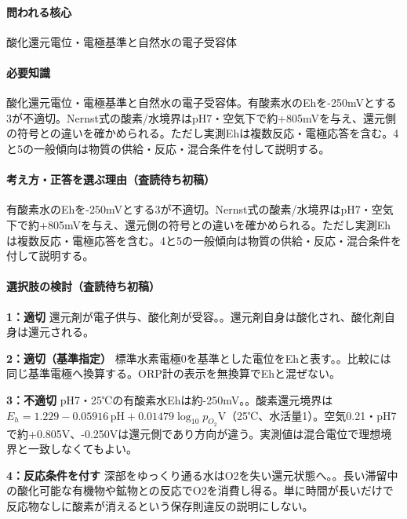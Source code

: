 \paragraph{問われる核心} 酸化還元電位・電極基準と自然水の電子受容体

\paragraph{必要知識} 酸化還元電位・電極基準と自然水の電子受容体。有酸素水のEhを-250mVとする3が不適切。Nernst式の酸素/水境界はpH7・空気下で約+805mVを与え、還元側の符号との違いを確かめられる。ただし実測Ehは複数反応・電極応答を含む。4と5の一般傾向は物質の供給・反応・混合条件を付して説明する。

\paragraph{考え方・正答を選ぶ理由（査読待ち初稿）} 有酸素水のEhを-250mVとする3が不適切。Nernst式の酸素/水境界はpH7・空気下で約+805mVを与え、還元側の符号との違いを確かめられる。ただし実測Ehは複数反応・電極応答を含む。4と5の一般傾向は物質の供給・反応・混合条件を付して説明する。

\paragraph{選択肢の検討（査読待ち初稿）}\mbox{}\par

\noindent\textbf{1：適切} 還元剤が電子供与、酸化剤が受容。。還元剤自身は酸化され、酸化剤自身は還元される。\par

\noindent\textbf{2：適切（基準指定）} 標準水素電極0を基準とした電位をEhと表す。。比較には同じ基準電極へ換算する。ORP計の表示を無換算でEhと混ぜない。\par

\noindent\textbf{3：不適切} pH7・25℃の有酸素水Ehは約-250mV。。酸素還元境界は\(E_h=1.229-0.05916\,\mathrm{pH}+0.01479\log_{10}p_{O_2}\)V（25℃、水活量1）。空気0.21・pH7で約+0.805V、-0.250Vは還元側であり方向が違う。実測値は混合電位で理想境界と一致しなくてもよい。\par

\noindent\textbf{4：反応条件を付す} 深部をゆっくり通る水はO2を失い還元状態へ。。長い滞留中の酸化可能な有機物や鉱物との反応でO2を消費し得る。単に時間が長いだけで反応物なしに酸素が消えるという保存則違反の説明にしない。\par

